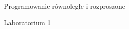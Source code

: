 \documentclass{article}
\begin{document}
\begin{center}
    Programowanie równoległe i rozproszone
    
\vspace{20pt} 

    Laboratorium 1
\end{center}
\end{document}
